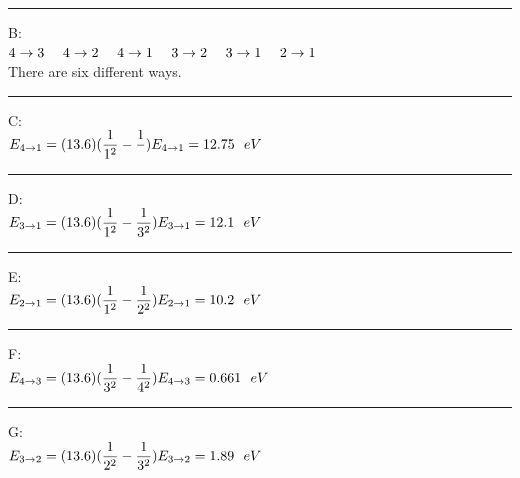 \documentclass[fleqn]{article}
\begin{document}
\begin{enumerate}
    \textcolor{hwColor}{ 
      \rule{16cm}{0.6pt} 
    } 

    \textcolor{hwColor}{
      B: \\
      $
        4 \rightarrow 3 ~~~~ 4 \rightarrow 2 ~~~~ 4 \rightarrow 1 ~~~~ 3 \rightarrow 2 ~~~~ 3 \rightarrow 1 ~~~~ 2 \rightarrow 1 \\
      $ \\
      There are six different ways.
    }

    \textcolor{hwColor}{ 
      \rule{16cm}{0.6pt} 
    } 

    \textcolor{hwColor}{
      C: \\
      $
        E_{4 \rightarrow 1}=(13.6)(\dfrac{1}{1^2}-\dfrac{1}{}) \\
        \\
        E_{4 \rightarrow 1}=12.75 ~~ eV
      $
    }

    \textcolor{hwColor}{ 
      \rule{16cm}{0.6pt} 
    } 

    \textcolor{hwColor}{
      D: \\
      $
        E_{3 \rightarrow 1}=(13.6)(\dfrac{1}{1^2}-\dfrac{1}{3^2}) \\
        \\
        E_{3 \rightarrow 1}=12.1 ~~ eV
      $
    }

    \textcolor{hwColor}{ 
      \rule{16cm}{0.6pt} 
    } 

    \textcolor{hwColor}{
      E: \\
      $
        E_{2 \rightarrow 1}=(13.6)(\dfrac{1}{1^2}-\dfrac{1}{2^2}) \\
        \\
        E_{2 \rightarrow 1}=10.2 ~~ eV
      $
    }

    \textcolor{hwColor}{ 
      \rule{16cm}{0.6pt} 
    } 

    \textcolor{hwColor}{
      F: \\
      $
        E_{4 \rightarrow 3}=(13.6)(\dfrac{1}{3^2}-\dfrac{1}{4^2}) \\
        \\
        E_{4 \rightarrow 3}=0.661 ~~ eV
      $
    }

    \textcolor{hwColor}{ 
      \rule{16cm}{0.6pt} 
    } 

    \textcolor{hwColor}{
      G: \\
      $
        E_{3 \rightarrow 2}=(13.6)(\dfrac{1}{2^2}-\dfrac{1}{3^2}) \\
        \\
        E_{3 \rightarrow 2}=1.89 ~~ eV
      $
    }


\end{enumerate}
\end{document}
